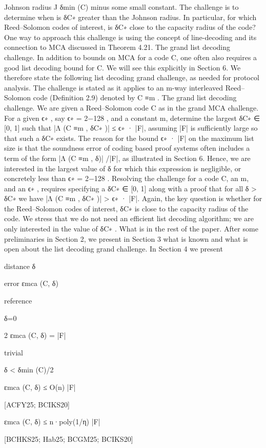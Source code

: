 \documentclass[11pt]{article}
\begin{document}
Johnson radius J δmin (C) minus some small constant. The challenge is to determine when is δC∗
greater than the Johnson radius. In particular, for which Reed–Solomon codes of interest, is δC∗
close to the capacity radius of the code? One way to approach this challenge is using the concept
of line-decoding and its connection to MCA discussed in Theorem 4.21.
The grand list decoding challenge. In addition to bounds on MCA for a code C, one often
also requires a good list decoding bound for C. We will see this explicitly in Section 6. We therefore
state the following list decoding grand challenge, as needed for protocol analysis. The challenge is
stated as it applies to an m-way interleaved Reed–Solomon code (Definition 2.9) denoted by C ≡m .
The grand list decoding challenge. We are given a Reed–Solomon code C as in the
grand MCA challenge. For a given ϵ∗ , say ϵ∗ = 2−128 , and a constant m,
determine the largest δC∗ ∈ [0, 1] such that |Λ (C ≡m , δC∗ )| ≤ ϵ∗ · |F|,
assuming |F| is sufficiently large so that such a δC∗ exists.
The reason for the bound ϵ∗ · |F| on the maximum list size is that the soundness error of coding
based proof systems often includes a term of the form |Λ (C ≡m , δ)| /|F|, as illustrated in Section 6.
Hence, we are interested in the largest value of δ for which this expression is negligible, or concretely
less than ϵ∗ = 2−128 .
Resolving the challenge for a code C, an m, and an ϵ∗ , requires specifying a δC∗ ∈ [0, 1] along
with a proof that for all δ > δC∗ we have |Λ (C ≡m , δC∗ )| > ϵ∗ · |F|. Again, the key question is whether
for the Reed–Solomon codes of interest, δC∗ is close to the capacity radius of the code. We stress
that we do not need an efficient list decoding algorithm; we are only interested in the value of δC∗ .
What is in the rest of the paper. After some preliminaries in Section 2, we present in Section 3
what is known and what is open about the list decoding grand challenge. In Section 4 we present

distance δ

error εmca (C, δ)

reference

δ=0

2
εmca (C, δ) = |F|

trivial

δ < δmin (C)/2

εmca (C, δ) ≤ O(n)
|F|

[ACFY25; BCIKS20]

εmca (C, δ) ≤ n·poly(1/η)
|F|

[BCHKS25; Hab25; BCGM25; BCIKS20]
\end{document}
